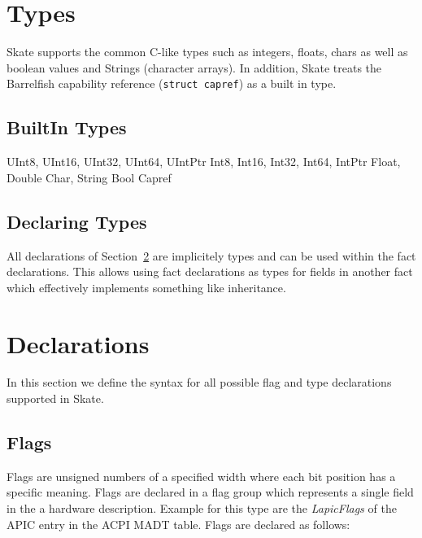 \documentclass[a4paper,11pt,twoside]{report}
\begin{document}
{{\begin{description}
\end{description}

\section{Types}\label{sec:decl:types}

Skate supports the common C-like types such as integers, floats, chars as well 
as boolean values and Strings (character arrays). In addition, Skate treats
the Barrelfish capability reference (\texttt{struct capref}) as a built in 
type.

\subsection{BuiltIn Types}
\begin{syntax}
UInt8, UInt16, UInt32, UInt64, UIntPtr
Int8, Int16, Int32, Int64, IntPtr
Float, Double
Char, String
Bool
Capref
\end{syntax}

\subsection{Declaring Types}

All declarations of Section~\ref{sec:decl:decls} are implicitely types and can
be used within the fact declarations. This allows using fact declarations as 
types for fields in another fact which effectively implements something like
inheritance. 



\section{Declarations}\label{sec:decl:decls}

In this section we define the syntax for all possible flag and type 
declarations supported in Skate. 

\subsection{Flags}
\label{sec:decl:flags}

Flags are unsigned numbers of a specified width where each bit position has a
specific meaning. Flags are declared in a flag group which represents a single
field in the a hardware description. Example for this type are the 
\emph{LapicFlags} of the APIC entry in the ACPI MADT table. Flags are declared 
as follows:

}}
\end{document}
